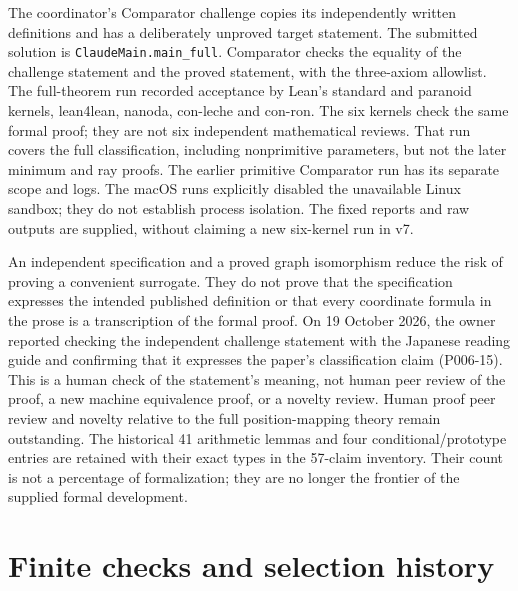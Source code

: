 \documentclass[11pt]{amsart}
\newcommand{\record}[1]{\nolinkurl{#1}}
\begin{document}
The coordinator's Comparator challenge copies its independently
written definitions and has a deliberately unproved target statement.
The submitted solution is \record{ClaudeMain.main_full}.
Comparator checks the equality of the challenge statement and the
proved statement, with the three-axiom allowlist. The full-theorem
run recorded acceptance by Lean's standard and paranoid kernels,
lean4lean, nanoda, con-leche and con-ron. The six kernels check the
same formal proof; they are not six independent mathematical reviews.
That run covers the full classification, including nonprimitive
parameters, but not the later minimum and ray proofs. The earlier
primitive Comparator run has its separate scope and logs.
The macOS runs explicitly disabled the unavailable Linux sandbox;
they do not establish process isolation. The fixed reports and raw
outputs are supplied, without claiming a new six-kernel run in v7.

An independent specification and a proved graph isomorphism reduce
the risk of proving a convenient surrogate. They do not prove that
the specification expresses the intended published definition or
that every coordinate formula in the prose is a transcription of
the formal proof. On 19 October 2026, the owner reported checking
the independent challenge statement with the Japanese reading guide
and confirming that it expresses the paper's classification claim
(P006-15). This is a human check of the statement's meaning,
not human peer review of the proof, a new machine equivalence proof,
or a novelty review. Human proof peer review and novelty relative to
the full position-mapping theory remain outstanding.
The historical 41 arithmetic lemmas and four conditional/prototype
entries are retained with their exact types in the 57-claim inventory.
Their count is not a percentage of formalization; they are no longer
the frontier of the supplied formal development.

\section{Finite checks and selection history}\label{sec:checks}
\end{document}

